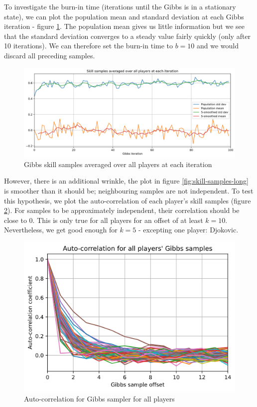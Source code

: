 \documentclass[]{article}
\newcommand{\figwidth}{0.6\linewidth}
\begin{document}
To investigate the burn-in time (iterations until the Gibbs is in a stationary state), we can plot the population mean and standard deviation at each Gibbs iteration - figure \ref{fig:burn-in}. The population mean gives us little information but we see that the standard deviation converges to a steady value fairly quickly (only after 10 iterations). We can therefore set the burn-in time to $b=10$ and we would discard all preceding samples. 

\begin{figure}[!h]
	\centering
	\includegraphics[width=0.8\linewidth]{burn-in.png}
	\caption{Gibbs skill samples averaged over all players at each iteration}
	\label{fig:burn-in}
\end{figure}

However, there is an additional wrinkle, the plot in figure \ref{fig:skill-samples-long} is smoother than it should be; neighbouring samples are not independent. To test this hypothesis, we plot the auto-correlation of each player's skill samples (figure \ref{fig:auto-cor}). For samples to be approximately independent, their correlation should be close to 0. This is only true for all players for an offset of at least $k=10$. Nevertheless, we get good enough for $k=5$ - excepting one player: Djokovic.

\begin{figure}[!h]
	\centering
	\includegraphics[width=\figwidth]{auto-cor.png}
	\caption{Auto-correlation for Gibbs sampler for all players}
	\label{fig:auto-cor}
\end{figure}
\end{document}
